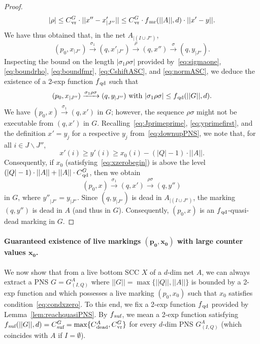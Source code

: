 \documentclass[11pt,a4paper]{amsart}
\newcommand{\step}[1]{\mathrel{\xrightarrow{#1}}}
\newcommand{\nnorm}[1]{||#1||}
\newcommand{\vr}{{}_\textnormal{vr}}
\newcommand{\mr}{{}_\textnormal{mr}}
\newcommand{\dead}{{}_\textnormal{dead}}
\newcommand{\suf}{{}_\textnormal{suf}}
\newcommand{\qd}{{}_\textnormal{qd}}
\newcommand{\restr}[1]{_{|{#1}}}
\theoremstyle{plain}
\theoremstyle{definition}
\theoremstyle{defC}
\theoremstyle{thmC}
\begin{document}
\begin{proof}
\begin{equation}\label{eq:boundrho}
	|\rho|\leq C\vr^G\cdot \nnorm{x''-x'\restr{J''}}\leq
C\vr^G\cdot f\mr(\nnorm{A},d)\cdot \nnorm{x'-y}.
\end{equation}
We have thus obtained that, in the net $A\restr{(I\cup J'')}$,
\[(p_0,x\restr{J''})\step{\sigma_1}(q,x'\restr{J''})\step{\rho}(q,x'')\step{\sigma}(q,y\restr{J''}).\]
Inspecting the bound on the length $|\sigma_1\rho\sigma|$ provided
by~\eqref{eq:sigmaone}, \eqref{eq:boundrho}, 
\eqref{eq:boundfmr}, \eqref{eq:CshiftASC},
and \eqref{eq:normASC}, we deduce the existence 
 of a 2-exp function $f\qd$ such that
\[(p_0,x\restr{J''})\step{\sigma_1\rho\sigma}(q,y\restr{J''})\text{ with }
|\sigma_1\rho\sigma|\leq f\qd(\nnorm{G},d).\]
We have $(p_0,x)\step{\sigma_1}(q,x')$ in $G$; however, the sequence $\rho\sigma$ might not be executable from $(q,x')$ in
$G$.
Recalling~\eqref{eq:Jprimeprime}, \eqref{eq:yprimefirst}, and the definition 
 $x'=y_j$ for a respective $y_j$ from~\eqref{eq:downupPNS}, we note
 that,
for all $i\in J\smallsetminus J''$,
\[x'(i)\geq y'(i)\geq x_0(i)-(|Q|-1)\cdot\nnorm{A}.\]
Consequently, if $x_0$ (satisfying~\eqref{eq:xzerobegin}) is above the level
$(|Q|-1)\cdot\nnorm{A}+\nnorm{A}\cdot C\qd^G$, then we obtain 
\[(p_0,x)\step{\sigma_1}(q,x')\step{\rho\sigma}(q,y'')\]
in $G$, where ${y''}\restr{J''}=y\restr{J''}$. Since
$(q,y\restr{J''})$ is dead in $A\restr{(I\cup J'')}$, the marking
$(q,y'')$ is dead in $A$ (and thus in $G$). Consequently, $(p_0,x)$ is an $f\qd$-quasi-dead marking in $G$.
\end{proof}	

\paragraph{Guaranteed existence of live markings $\bm{(p_0,x_0)}$ with large
counter values $\bm{x_0}$.}
We now show that from a live bottom SCC $X$ of a $d$-dim net $A$, we can always extract a
PNS $G=G_{(I,Q)}^A$ where $\nnorm{G}=\max\{\nnorm{Q},\nnorm{A}\}$ is
bounded by a 2-exp function and which possesses a live
marking $(p_0,x_0)$ such that $x_0$ satisfies
condition~\eqref{eq:condxzero}. To this end,
we fix a 2-exp function $f\qd$ provided by Lemma~\ref{lem:reachquasiPNS}.
By $f\suf$, we mean a 2-exp function satisfying
$f\suf(\nnorm{G},d)=C\suf^G=\max\{C\dead^{A},C\vr^G\}$ for every $d$-dim
PNS $G_{(I,Q)}^A$ (which coincides with $A$ if $I=\emptyset$).
\end{document}
